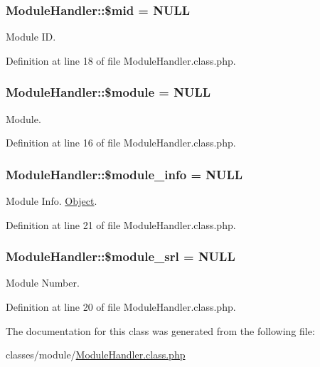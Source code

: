 \subsubsection[{\texorpdfstring{\$mid}{$mid}}]{\setlength{\rightskip}{0pt plus 5cm}Module\+Handler\+::\$mid = N\+U\+LL}\hypertarget{classModuleHandler_a6bb7e9e29c0fb9893d051179281b093e}{}\label{classModuleHandler_a6bb7e9e29c0fb9893d051179281b093e}


Module ID. 



Definition at line 18 of file Module\+Handler.\+class.\+php.

\subsubsection[{\texorpdfstring{\$module}{$module}}]{\setlength{\rightskip}{0pt plus 5cm}Module\+Handler\+::\$module = N\+U\+LL}\hypertarget{classModuleHandler_a24f28ac6c101582f043bef672a9f3b00}{}\label{classModuleHandler_a24f28ac6c101582f043bef672a9f3b00}


Module. 



Definition at line 16 of file Module\+Handler.\+class.\+php.

\subsubsection[{\texorpdfstring{\$module\+\_\+info}{$module_info}}]{\setlength{\rightskip}{0pt plus 5cm}Module\+Handler\+::\$module\+\_\+info = N\+U\+LL}\hypertarget{classModuleHandler_a2388e5ef665a5a82efa00c8c894df33c}{}\label{classModuleHandler_a2388e5ef665a5a82efa00c8c894df33c}


Module Info. \hyperlink{classObject}{Object}. 



Definition at line 21 of file Module\+Handler.\+class.\+php.

\subsubsection[{\texorpdfstring{\$module\+\_\+srl}{$module_srl}}]{\setlength{\rightskip}{0pt plus 5cm}Module\+Handler\+::\$module\+\_\+srl = N\+U\+LL}\hypertarget{classModuleHandler_ad79751537e64d7bfc7dc6fa4280043b0}{}\label{classModuleHandler_ad79751537e64d7bfc7dc6fa4280043b0}


Module Number. 



Definition at line 20 of file Module\+Handler.\+class.\+php.



The documentation for this class was generated from the following file\+:\begin{DoxyCompactItemize}
\item 
classes/module/\hyperlink{ModuleHandler_8class_8php}{Module\+Handler.\+class.\+php}\end{DoxyCompactItemize}
